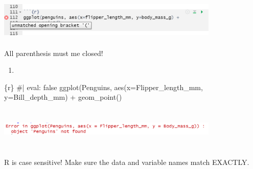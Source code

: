 \documentclass[
  letterpaper,
  DIV=11,
  numbers=noendperiod]{scrreprt}
\newenvironment{Shaded}{\begin{snugshade}}{\end{snugshade}}
\newcommand{\AttributeTok}[1]{\textcolor[rgb]{0.40,0.45,0.13}{#1}}
\newcommand{\CommentTok}[1]{\textcolor[rgb]{0.37,0.37,0.37}{#1}}
\newcommand{\FunctionTok}[1]{\textcolor[rgb]{0.28,0.35,0.67}{#1}}
\newcommand{\InformationTok}[1]{\textcolor[rgb]{0.37,0.37,0.37}{#1}}
\newcommand{\NormalTok}[1]{\textcolor[rgb]{0.00,0.23,0.31}{#1}}
\newcommand{\SpecialCharTok}[1]{\textcolor[rgb]{0.37,0.37,0.37}{#1}}
\newcommand{\StringTok}[1]{\textcolor[rgb]{0.13,0.47,0.30}{#1}}
\providecommand{\tightlist}{%
  \setlength{\itemsep}{0pt}\setlength{\parskip}{0pt}}\usepackage{longtable,booktabs,array}
\begin{document}
\begin{tcolorbox}[enhanced jigsaw, breakable, colback=white, bottomrule=.15mm, leftrule=.75mm, colframe=quarto-callout-note-color-frame, arc=.35mm, rightrule=.15mm, toprule=.15mm, left=2mm, opacityback=0]
\includegraphics[width=4.16667in,height=0.78125in]{images/images_lecture/error_2b.png}

All parenthesis must me closed!

\begin{enumerate}
\def\labelenumi{\arabic{enumi}.}
\setcounter{enumi}{2}
\tightlist
\item
\end{enumerate}

\begin{Shaded}
\begin{Highlighting}[]
\InformationTok{\textasciigrave{}\textasciigrave{}\textasciigrave{}\{r\}}
\CommentTok{\#| eval: false}
\FunctionTok{ggplot}\NormalTok{(Penguins, }\FunctionTok{aes}\NormalTok{(}\AttributeTok{x=}\NormalTok{Flipper\_length\_mm, }\AttributeTok{y=}\NormalTok{Bill\_depth\_mm) }\SpecialCharTok{+}
  \FunctionTok{geom\_point}\NormalTok{()}
\StringTok{\textasciigrave{}\textasciigrave{}\textasciigrave{}}
\end{Highlighting}
\end{Shaded}

\includegraphics[width=4.16667in,height=0.78125in]{images/images_lecture/error_2c.png}

R is case sensitive! Make sure the data and variable names match
EXACTLY.

\end{tcolorbox}
\end{document}
